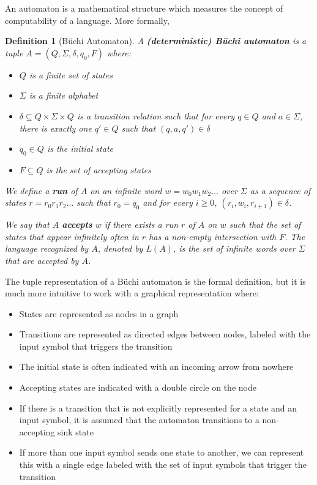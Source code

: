 \documentclass[11pt]{article}
\newtheorem{definition}{Definition}
\theoremstyle{definition}
\theoremstyle{remark}
\begin{document}
An automaton is a mathematical structure which measures the concept of computability of a language. More formally,

\begin{definition}[Büchi Automaton]\label{def:buchi}
A \textbf{(deterministic) Büchi automaton} is a tuple $A=(Q,\Sigma,\delta,q_0,F)$ where:
\begin{itemize}[leftmargin=1.5em]
  \item $Q$ is a finite set of states
  \item $\Sigma$ is a finite alphabet
  \item $\delta \subseteq Q \times \Sigma \times Q$ is a transition relation such that for every $q \in Q$ and $a \in \Sigma$, there is exactly one $q' \in Q$ such that $(q,a,q') \in \delta$
  \item $q_0 \in Q$ is the initial state
  \item $F \subseteq Q$ is the set of accepting states
\end{itemize}

We define a \textbf{run} of $A$ on an infinite word $w=w_0 w_1 w_2 \ldots$ over $\Sigma$ as a sequence of states $r=r_0 r_1 r_2 \ldots$ such that $r_0=q_0$ and for every $i \geq 0$, $(r_i,w_i,r_{i+1}) \in \delta$.

We say that $A$ \textbf{accepts} $w$ if there exists a run $r$ of $A$ on $w$ such that the set of states that appear infinitely often in $r$ has a non-empty intersection with $F$. The language recognized by $A$, denoted by $L(A)$, is the set of infinite words over $\Sigma$ that are accepted by $A$.
\end{definition}

The tuple representation of a Büchi automaton is the formal definition, but it is much more intuitive to work with a graphical representation where:
\begin{itemize}[leftmargin=1.5em]
  \item States are represented as nodes in a graph
  \item Transitions are represented as directed edges between nodes, labeled with the input symbol that triggers the transition
  \item The initial state is often indicated with an incoming arrow from nowhere
  \item Accepting states are indicated with a double circle on the node
  \item If there is a transition that is not explicitly represented for a state and an input symbol, it is assumed that the automaton transitions to a non-accepting sink state
  \item If more than one input symbol sends one state to another, we can represent this with a single edge labeled with the set of input symbols that trigger the transition
\end{itemize}
\end{document}
